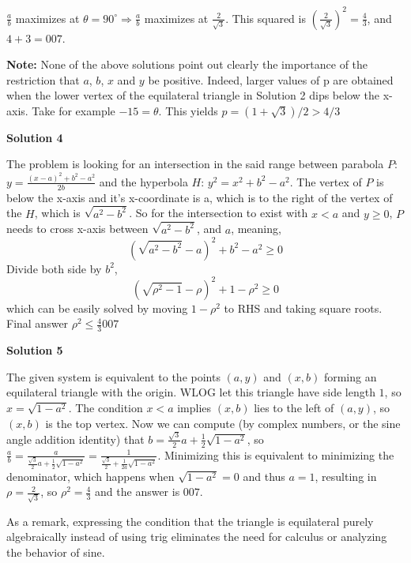 \begin{enumerate}
 $\frac ab$ maximizes at $\theta = 90^{\circ} \Longrightarrow \frac ab$ maximizes at $\frac 2{\sqrt {3}}$. This squared is $(\frac 2{\sqrt {3}})^2 = \frac4{3}$, and $4 +  3 = \boxed{007}$.

 \textbf{Note:} None of the above solutions point out clearly the importance of the restriction that $a$, $b$, $x$ and $y$ be positive. Indeed, larger values of p are obtained when the lower vertex of the equilateral triangle in Solution 2 dips below the x-axis. Take for example $-15= \theta$. This yields $p = (1 + \sqrt{3})/2 > 4/3$




\textbf{Solution 4}

The problem is looking for an intersection in the said range between parabola $P$: $y = \frac{(x-a)^2 + b^2-a^2}{2b}$ and the hyperbola $H$: $y^2 = x^2 + b^2 - a^2$. The vertex of $P$ is below the x-axis and it's x-coordinate is a, which is to the right of the vertex of the $H$, which is $\sqrt{a^2 - b^2}$. So for the intersection to exist with $x<a$ and $y \geq 0$, $P$ needs to cross x-axis between $\sqrt{a^2 - b^2}$, and $a$, meaning,
 \[(\sqrt{a^2 - b^2}-a)^2 + b^2-a^2 \geq 0\]Divide both side by $b^2$,
 \[(\sqrt{\rho^2 - 1}-\rho)^2 + 1-\rho^2 \geq 0\]which can be easily solved by moving $1-\rho^2$ to RHS and taking square roots. Final answer $\rho^2 \leq \frac{4}{3}$$\boxed{007}$




\textbf{Solution 5}

The given system is equivalent to the points $(a,y)$ and $(x,b)$ forming an equilateral triangle with the origin. WLOG let this triangle have side length $1$, so $x=\sqrt{1-a^2}$. The condition $x<a$ implies $(x,b)$ lies to the left of $(a,y)$, so $(x,b)$ is the top vertex. Now we can compute (by complex numbers, or the sine angle addition identity) that $b = \frac{\sqrt{3}}{2}a + \frac{1}{2}\sqrt{1-a^2}$, so $\frac{a}{b} = \frac{a}{\frac{\sqrt{3}}{2}a + \frac{1}{2}\sqrt{1-a^2}} = \frac{1}{\frac{\sqrt{3}}{2} + \frac{1}{2a}\sqrt{1-a^2}}$. Minimizing this is equivalent to minimizing the denominator, which happens when $\sqrt{1-a^2} = 0$ and thus $a=1$, resulting in $\rho = \frac{2}{\sqrt{3}}$, so $\rho^2 = \frac{4}{3}$ and the answer is $\boxed{007}$.

 As a remark, expressing the condition that the triangle is equilateral purely algebraically instead of using trig eliminates the need for calculus or analyzing the behavior of sine.

 




\end{enumerate}
